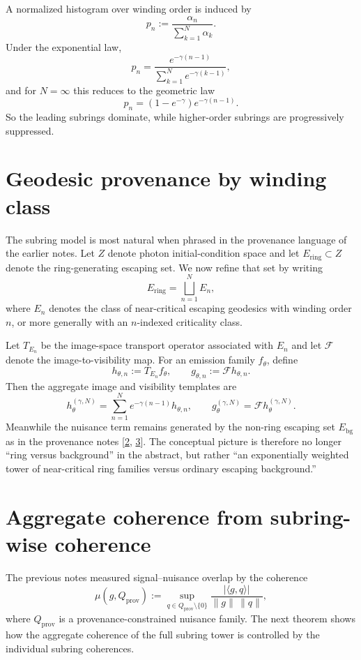 \documentclass[10pt,letterpaper,twocolumn]{article}
\begin{document}
A normalized histogram over winding order is induced by
\[
p_n := \frac{\alpha_n}{\sum_{k=1}^{N}\alpha_k}.
\]
Under the exponential law,
\[
p_n = \frac{e^{-\gamma(n-1)}}{\sum_{k=1}^{N} e^{-\gamma(k-1)}},
\]
and for $N=\infty$ this reduces to the geometric law
\[
p_n = (1-e^{-\gamma})e^{-\gamma(n-1)}.
\]
So the leading subrings dominate, while higher-order subrings are progressively suppressed.

\section{Geodesic provenance by winding class}

The subring model is most natural when phrased in the provenance language of the earlier notes. Let $Z$ denote photon initial-condition space and let $E_{\mathrm{ring}}\subset Z$ denote the ring-generating escaping set. We now refine that set by writing
\[
E_{\mathrm{ring}} = \bigsqcup_{n=1}^{N} E_n,
\]
where $E_n$ denotes the class of near-critical escaping geodesics with winding order $n$, or more generally with an $n$-indexed criticality class.

Let $T_{E_n}$ be the image-space transport operator associated with $E_n$ and let $\mathcal F$ denote the image-to-visibility map. For an emission family $f_\theta$, define
\[
h_{\theta,n} := T_{E_n}f_\theta,
\qquad
g_{\theta,n} := \mathcal F h_{\theta,n}.
\]
Then the aggregate image and visibility templates are
\[
h_\theta^{(\gamma,N)} = \sum_{n=1}^{N} e^{-\gamma(n-1)} h_{\theta,n},
\qquad
g_\theta^{(\gamma,N)} = \mathcal F h_\theta^{(\gamma,N)}.
\]
Meanwhile the nuisance term remains generated by the non-ring escaping set $E_{\mathrm{bg}}$ as in the provenance notes [\hyperlink{ref-2}{2}, \hyperlink{ref-3}{3}]. The conceptual picture is therefore no longer “ring versus background” in the abstract, but rather “an exponentially weighted tower of near-critical ring families versus ordinary escaping background.”

\section{Aggregate coherence from subring-wise coherence}

The previous notes measured signal--nuisance overlap by the coherence
\[
\mu(g,Q_{\mathrm{prov}})
:=
\sup_{q\in Q_{\mathrm{prov}}\setminus\{0\}}
\frac{|\langle g,q\rangle|}{\|g\|\,\|q\|},
\]
where $Q_{\mathrm{prov}}$ is a provenance-constrained nuisance family. The next theorem shows how the aggregate coherence of the full subring tower is controlled by the individual subring coherences.
\end{document}
